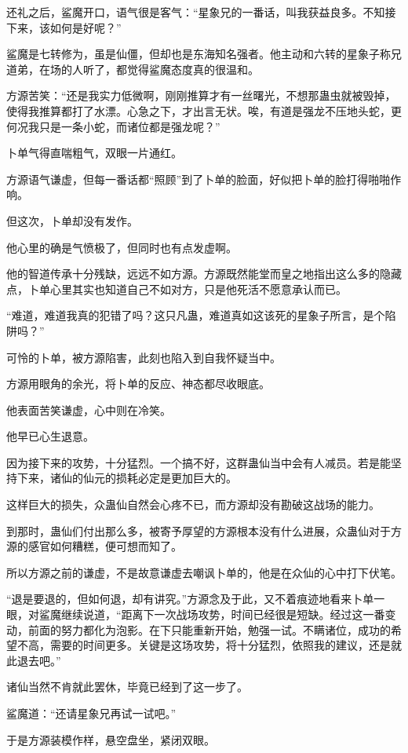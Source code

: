 \begin{this_body}
还礼之后，鲨魔开口，语气很是客气：“星象兄的一番话，叫我获益良多。不知接下来，该如何是好呢？”

鲨魔是七转修为，虽是仙僵，但却也是东海知名强者。他主动和六转的星象子称兄道弟，在场的人听了，都觉得鲨魔态度真的很温和。

方源苦笑：“还是我实力低微啊，刚刚推算才有一丝曙光，不想那蛊虫就被毁掉，使得我推算都打了水漂。心急之下，才出言无状。唉，有道是强龙不压地头蛇，更何况我只是一条小蛇，而诸位都是强龙呢？”

卜单气得直喘粗气，双眼一片通红。

方源语气谦虚，但每一番话都“照顾”到了卜单的脸面，好似把卜单的脸打得啪啪作响。

但这次，卜单却没有发作。

他心里的确是气愤极了，但同时也有点发虚啊。

他的智道传承十分残缺，远远不如方源。方源既然能堂而皇之地指出这么多的隐藏点，卜单心里其实也知道自己不如对方，只是他死活不愿意承认而已。

“难道，难道我真的犯错了吗？这只凡蛊，难道真如这该死的星象子所言，是个陷阱吗？”

可怜的卜单，被方源陷害，此刻也陷入到自我怀疑当中。

方源用眼角的余光，将卜单的反应、神态都尽收眼底。

他表面苦笑谦虚，心中则在冷笑。

他早已心生退意。

因为接下来的攻势，十分猛烈。一个搞不好，这群蛊仙当中会有人减员。若是能坚持下来，诸仙的仙元的损耗必定是更加巨大的。

这样巨大的损失，众蛊仙自然会心疼不已，而方源却没有勘破这战场的能力。

到那时，蛊仙们付出那么多，被寄予厚望的方源根本没有什么进展，众蛊仙对于方源的感官如何糟糕，便可想而知了。

所以方源之前的谦虚，不是故意谦虚去嘲讽卜单的，他是在众仙的心中打下伏笔。

“退是要退的，但如何退，却有讲究。”方源念及于此，又不着痕迹地看来卜单一眼，对鲨魔继续说道，“距离下一次战场攻势，时间已经很是短缺。经过这一番变动，前面的努力都化为泡影。在下只能重新开始，勉强一试。不瞒诸位，成功的希望不高，需要的时间更多。关键是这场攻势，将十分猛烈，依照我的建议，还是就此退去吧。”

诸仙当然不肯就此罢休，毕竟已经到了这一步了。

鲨魔道：“还请星象兄再试一试吧。”

于是方源装模作样，悬空盘坐，紧闭双眼。


\end{this_body}
